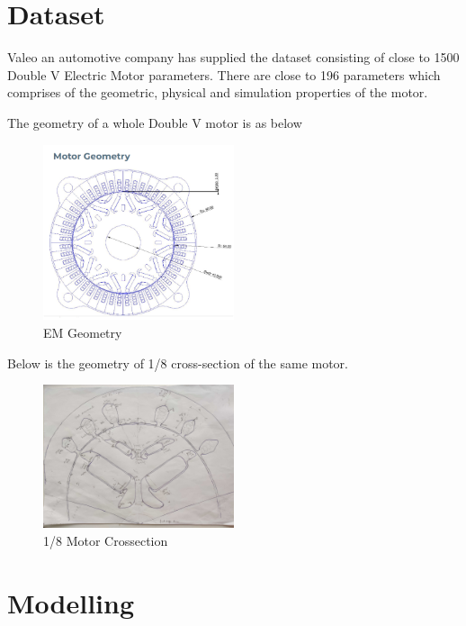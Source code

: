 \documentclass[a4paper,12pt]{article}
\begin{document}
\newpage 

\section*{Dataset} 

Valeo an automotive company has supplied the dataset consisting of close to 1500 Double V Electric Motor parameters. 
There are close to 196 parameters which comprises of the geometric, physical and simulation properties of the motor.

The geometry of a whole Double V motor is as below

\begin{figure}[h]
    \centering
    \includegraphics[width=0.5\textwidth]{./ReportImages/FullMotor.png} 
    \caption{EM Geometry}
    \label{fig:Full Motor}
\end{figure}

Below is the geometry of 1/8 cross-section of the same motor.

\begin{figure}[h]
    \centering
    \includegraphics[width=0.5\textwidth]{./ReportImages/EMCrosssection.jpg} 
    \caption{1/8 Motor Crossection}
    \label{fig:1/8 Motor Crossection}
\end{figure}

\newpage 

\section*{Modelling}
\end{document}
